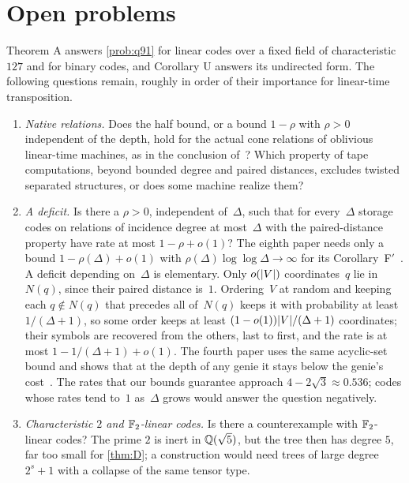\section{Open problems}\label{sec:open}

Theorem A answers \cref{prob:q91} for linear codes over a fixed field of characteristic $127$ and for binary codes, and
Corollary U answers its undirected form. The following questions remain, roughly in order of their importance for
linear-time transposition.

\begin{enumerate}[label=(\arabic*)]
\item \emph{Native relations.} Does the half bound, or a bound $1-\rho$ with $\rho>0$ independent of the depth, hold for the actual cone relations
of oblivious linear-time machines, as in the conclusion of~\cite[Proposition~9.2]{DirectedRecovery2026}? Which property
of tape computations, beyond bounded degree and paired distances, excludes twisted separated structures, or does some
machine realize them?
\item \emph{A deficit.} Is there a $\rho>0$, independent of~$\Delta$, such that for every~$\Delta$ storage codes on
relations of incidence degree at most~$\Delta$ with the paired-distance property have rate at most $1-\rho+o(1)$? The
eighth paper needs only a bound $1-\rho(\Delta)+o(1)$ with $\rho(\Delta)\log\log\Delta\to\infty$ for its
Corollary~F$'$~\cite[Remark~6.5]{BoundedNesting2026}. A deficit depending on~$\Delta$ is elementary. Only $o(\lvert V \rvert)$
coordinates~$q$ lie in~$N(q)$, since their paired distance is~$1$. Ordering~$V$ at random and keeping each $q\notin N(q)$
that precedes all of~$N(q)$ keeps it with probability at least $1/(\Delta+1)$, so some order keeps at least
$(1-o(1))\lvert V \rvert/(\Delta+1)$ coordinates; their symbols are recovered from the others, last to first, and the rate is at
most $1-1/(\Delta+1)+o(1)$. The fourth paper uses the same acyclic-set bound and shows that at the depth of any genie it
stays below the genie's cost~\cite[Proposition~4.14]{CurvedMotion2026}. The rates that our bounds guarantee approach
$4-2\sqrt3\approx0.536$; codes whose rates tend to~$1$ as~$\Delta$ grows would answer the question negatively.
\item \emph{Characteristic $2$ and $\mathbb{F}_2$-linear codes.} Is there a counterexample with $\mathbb{F}_2$-linear codes? The prime $2$ is
inert in $\mathbb{Q}(\sqrt5)$, but the tree then has degree $5$, far too small for \cref{thm:D}; a construction would need trees
of large degree $2^s+1$ with a collapse of the same tensor type.

\end{enumerate}
